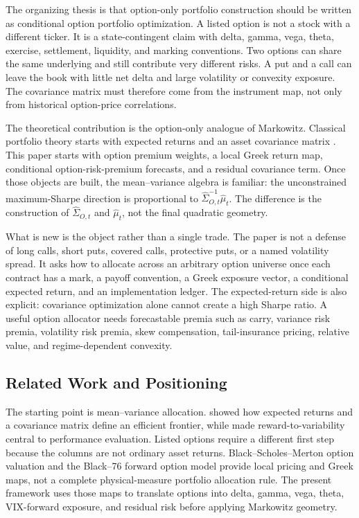 The organizing thesis is that option-only portfolio construction should be written as
conditional option portfolio optimization. A listed option is not a stock with a different
ticker. It is a state-contingent claim with delta, gamma, vega, theta, exercise, settlement,
liquidity, and marking conventions. Two options can share the same underlying and still
contribute very different risks. A put and a call can leave the book with little net delta and
large volatility or convexity exposure. The covariance matrix must therefore come from the
instrument map, not only from historical option-price correlations.

The theoretical contribution is the option-only analogue of Markowitz. Classical portfolio
theory starts with expected returns and an asset covariance matrix
\citep{markowitz1952portfolio}. This paper starts with option premium weights, a local
Greek return map, conditional option-risk-premium forecasts, and a residual covariance term.
Once those objects are built, the mean--variance algebra is familiar: the unconstrained
maximum-Sharpe direction is proportional to
\(\widehat\Sigma_{O,t}^{-1}\widehat\mu_t\). The difference is the construction of
\(\widehat\Sigma_{O,t}\) and \(\widehat\mu_t\), not the final quadratic geometry.

What is new is the object rather than a single trade. The paper is not a defense of long
calls, short puts, covered calls, protective puts, or a named volatility spread. It asks how
to allocate across an arbitrary option universe once each contract has a mark, a payoff
convention, a Greek exposure vector, a conditional expected return, and an implementation
ledger. The expected-return side is also explicit: covariance optimization alone cannot
create a high Sharpe ratio. A useful option allocator needs forecastable premia such as
carry, variance risk premia, volatility risk premia, skew compensation, tail-insurance
pricing, relative value, and regime-dependent convexity.

\subsection{Related Work and Positioning}

The starting point is mean--variance allocation. \citet{markowitz1952portfolio} showed how
expected returns and a covariance matrix define an efficient frontier, while
\citet{sharpe1966} made reward-to-variability central to performance evaluation. Listed
options require a different first step because the columns are not ordinary asset returns.
Black--Scholes--Merton option valuation \citep{blackscholes1973,merton1973} and the
Black--76 forward option model \citep{black1976commodity} provide local pricing and Greek
maps, not a complete physical-measure portfolio allocation rule. The present framework uses
those maps to translate options into delta, gamma, vega, theta, VIX-forward exposure, and
residual risk before applying Markowitz geometry.

